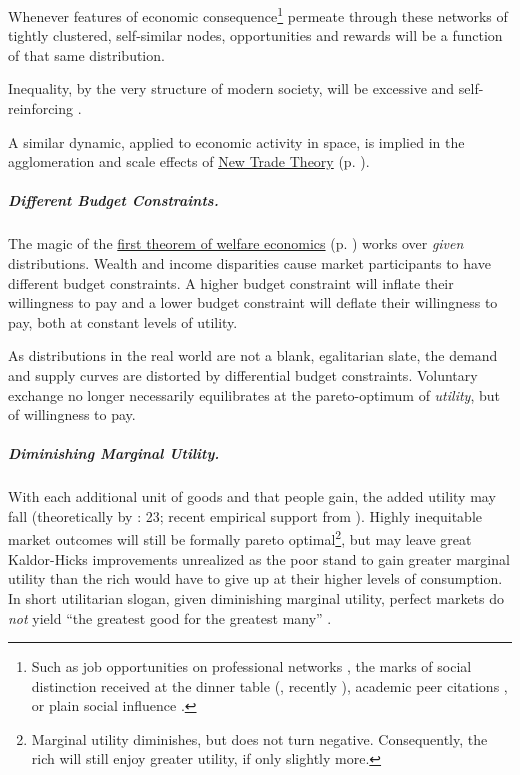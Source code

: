 \begin{enumerate}
	Whenever features of economic consequence\footnote{
		Such as job opportunities on professional networks \citep{Benkler2006}, the marks of social distinction received at the dinner table (\citealt{Bourdieu-1984-aa}, recently \citealt{Hartmann2002}), academic peer citations \citep{Jackson1968, Merton1988}, or plain social influence \citep{Asch}.} 
	permeate through these networks of tightly clustered, self-similar nodes, opportunities and rewards will be a function of that same distribution. 
	
	Inequality, by the very structure of modern society, will be excessive and self-reinforcing \citep{Cozzi2009,Keller2005,Andriani2007}.	
	
	A similar dynamic, applied to economic activity in space, is implied in the agglomeration and scale effects of \hyperref[sec:NTT]{New Trade Theory} (p. \pageref{sec:NTT}).
\end{enumerate}

\subparagraph{Different Budget Constraints.}  \label{sec:differentbudgetconstraints} The magic of the \hyperref[fn:1sttheorem]{first theorem of welfare economics} (p. \pageref{fn:1sttheorem}) works over \emph{given} distributions. Wealth and income disparities cause market participants to have different budget constraints. A higher budget constraint will inflate their willingness to pay and a lower budget constraint will deflate their willingness to pay, both at constant levels of utility. 


As distributions in the real world are not a blank, egalitarian slate, the demand and supply curves are distorted by differential budget constraints. Voluntary exchange no longer necessarily equilibrates at the pareto-optimum of \emph{utility}, but of willingness to pay.

\subparagraph{Diminishing Marginal Utility.} \label{sec:diminishingmarginalutility} With each additional unit of goods and  that people gain, the added utility may fall (theoretically by \citealt{Lerner1944}: 23; recent empirical support from \citealt{Ng-1997-aa,Veenhoven-2000-aa,Nickell2008}). Highly inequitable market outcomes will still be formally pareto optimal\footnote{
	Marginal utility diminishes, but does not turn negative. Consequently, the rich will still enjoy greater utility, if only slightly more.}, 
but may leave great Kaldor-Hicks improvements unrealized as the poor stand to gain greater marginal utility than the rich would have to give up at their higher levels of consumption. In short utilitarian slogan, given diminishing marginal utility, perfect markets do \emph{not} yield ``the greatest good for the greatest many'' \citep{Mill1863}.

